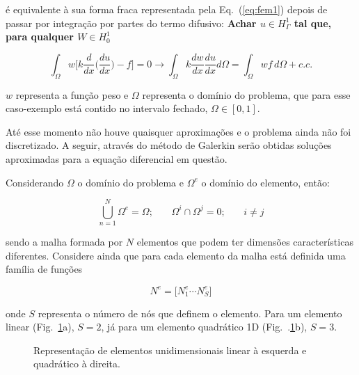 \noindent é equivalente à sua forma fraca representada pela Eq.~(\ref{eq:fem1}) 
depois de passar por integração por partes do termo difusivo:
\textbf{Achar $u \in H^1_\Gamma$ tal que, para qualquer $W \in H^1_0$}

\begin{equation}
	\int_{\Omega}w \bigg[ k \frac{d}{dx} \bigg( \frac{du}{dx} \bigg) -f
	\bigg]
	= 0 \longrightarrow
	\int_{\Omega} k \frac{dw}{dx} \frac{du}{dx} d\Omega
	= 
	\int_{\Omega} wf \, d\Omega + c.c.
	\label{eq:fem2}
\end{equation}

\noindent $w$ representa a função peso e $\Omega$ representa o domínio
do problema, que para esse caso-exemplo está contido no intervalo
fechado, $\Omega \in [0,1]$.  

Até esse momento não houve quaisquer aproximações e o problema ainda não
foi discretizado.  A seguir, através do método de Galerkin serão 
obtidas soluções aproximadas para a equação diferencial em questão. 

Considerando $\Omega$ o domínio do problema e $\Omega^e$ o domínio do
elemento, então:

\begin{equation}
	\bigcup_{n=1}^{N} \Omega^e 
	= 
	\Omega\text{;}
	\qquad
	\Omega^i \cap \Omega^j = 0\text{;}
	\qquad
	i \neq j
\label{eq:malha1}
\end{equation}\hspace{0.5cm}

\noindent sendo a malha formada por $N$ elementos que podem ter dimensões
características diferentes.  Considere ainda que para cada elemento da
malha está definida uma família de funções 

\begin{equation}
	N^e 
	= 
	\big [ 
	N_1^e \cdots N_S^e 
	\big] 
\label{eq:fem3}
\end{equation}\hspace{0.5cm}

\noindent onde $S$ representa o número de nós que definem o elemento.
Para um elemento linear (Fig.~\ref{fig:elemento1}a), $S=2$, já para um
elemento quadrático 1D (Fig.~.\ref{fig:elemento1}b), $S=3$.  

\begin{figure}[h]
	\centering
		 \caption{Representação de elementos unidimensionais linear à
		 esquerda e quadrático à direita.} 
	\label{fig:elemento1}
\end{figure}

